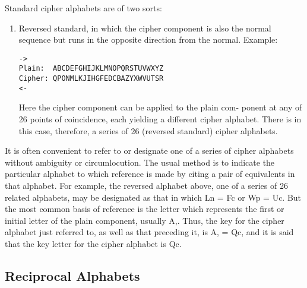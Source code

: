 \mypara Standard cipher alphabets are of two sorts:
\begin{enumerate}
(.1) Direct standard, in which cipher component is the normal
sequence but shifted to the right or left of its point of coincidence in the normal alphabet. Example:

\begin{verbatim}
—>
Plain:   ABCDEFGHIJKLMNOPQRSTUVWXYZ
Cipher : QRSTUVWXYZABCDEFGHIJKLMNOP
<-
\end{verbatim}

It is obvious that the cipher component can be applied to the
plain component at any one of 26 points of coincidence, but
since the alphabet that results from one of these applications
coincides exactly with the normal alphabet, a series of only
25 (direct standard) cipher alphabets results from the shifting
of the cipher component.

\item Reversed standard, in which the cipher component is also the
normal sequence but runs in the opposite direction from the
normal. Example:

\begin{verbatim}
->
Plain:  ABCDEFGHIJKLMNOPQRSTUVWXYZ
Cipher: QPONMLKJIHGFEDCBAZYXWVUTSR
<-
\end{verbatim}

Here the cipher component can be applied to the plain com-
ponent at any of 26 points of coincidence, each yielding a
different cipher alphabet. There is in this case, therefore, a
series of 26 (reversed standard) cipher alphabets.
\end{enumerate}

\mypara It is often convenient to refer to or designate one of a series of
cipher alphabets without ambiguity or circumlocution. The usual method
is to indicate the particular alphabet to which reference is made by citing
a pair of equivalents in that alphabet. For example, the reversed alphabet
above, one of a series of 26 related alphabets, may be designated as that
in which Ln = Fc or Wp = Uc. But the most common basis of reference is the letter which represents the ﬁrst or initial letter of the plain
component, usually A,. Thus, the key for the cipher alphabet just
referred to, as well as that preceding it, is A, = Qc, and it is said that the
key letter for the cipher alphabet is Qc.

\subsection{Reciprocal Alphabets}

